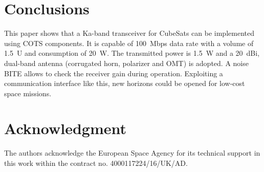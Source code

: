 \documentclass[conference,10pt,a4paper]{IEEEtran}%
\begin{document}
\section{Conclusions}
\label{sec:con}
This paper shows that a Ka-band transceiver
for CubeSats can be implemented using COTS components.
It is capable of 100~Mbps data rate with a volume of 1.5~U and consumption of 20~W.
The transmitted power is 1.5~W and a 20~dBi, dual-band antenna (corrugated horn, polarizer and OMT) is adopted.
A noise BITE allows to check the receiver gain during operation.
Exploiting a communication interface like this, new horizons could be opened for low-cost space missions.

\section*{Acknowledgment}
The authors acknowledge the European Space Agency for its technical support in this work within the contract no. 4000117224/16/UK/AD.



\end{document}
